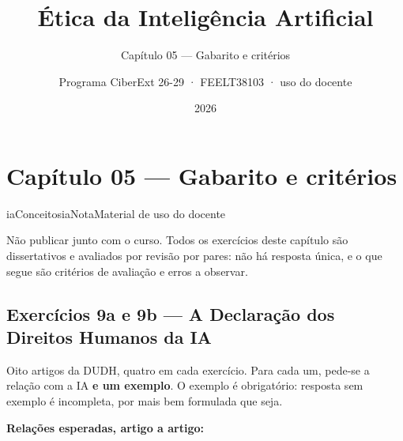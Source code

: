 \documentclass[
  11pt,
]{article}
\title{Ética da Inteligência Artificial}
\subtitle{Capítulo 05 --- Gabarito e critérios}
\author{Programa CiberExt 26-29 · FEELT38103 · uso do docente}
\date{2026}
\newenvironment{nota}[1][Nota]{\begin{iabox}{iaConceitos}{iaNota}{#1}}{\end{iabox}}
\begin{document}
\maketitle

{
\hypersetup{linkcolor=iaConceitos}
\setcounter{tocdepth}{2}
\tableofcontents
}
\hypertarget{capuxedtulo-05-gabarito-e-crituxe9rios}{%
\section{Capítulo 05 --- Gabarito e
critérios}\label{capuxedtulo-05-gabarito-e-crituxe9rios}}

\begin{nota}[Material de uso do docente]

Não publicar junto com o curso. Todos os exercícios deste capítulo são
dissertativos e avaliados por revisão por pares: não há resposta única,
e o que segue são critérios de avaliação e erros a observar.

\end{nota}

\hypertarget{exercuxedcios-9a-e-9b-a-declarauxe7uxe3o-dos-direitos-humanos-da-ia}{%
\subsection{Exercícios 9a e 9b --- A Declaração dos Direitos Humanos da
IA}\label{exercuxedcios-9a-e-9b-a-declarauxe7uxe3o-dos-direitos-humanos-da-ia}}

Oito artigos da DUDH, quatro em cada exercício. Para cada um, pede-se a
relação com a IA \textbf{e um exemplo}. O exemplo é obrigatório:
resposta sem exemplo é incompleta, por mais bem formulada que seja.

\textbf{Relações esperadas, artigo a artigo:}
\end{document}
